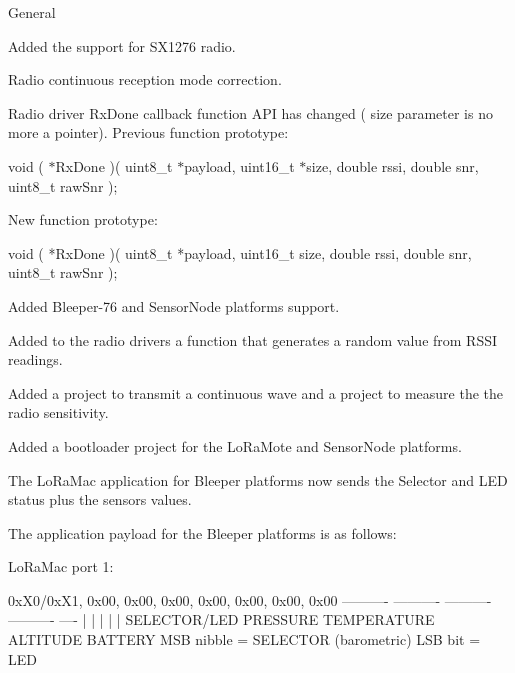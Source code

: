 \begin{DoxyItemize}
\item General
\begin{DoxyEnumerate}
\item Added the support for S\+X1276 radio.
\item Radio continuous reception mode correction.
\item Radio driver Rx\+Done callback function A\+PI has changed ( size parameter is no more a pointer). Previous function prototype\+:

void ( $\ast$\+Rx\+Done )( uint8\+\_\+t $\ast$payload, uint16\+\_\+t $\ast$size, double rssi, double snr, uint8\+\_\+t raw\+Snr );

New function prototype\+: \begin{DoxyVerb} void    ( *RxDone )( uint8_t *payload, uint16_t size, double rssi, double snr, uint8_t rawSnr );
\end{DoxyVerb}

\item Added Bleeper-\/76 and Sensor\+Node platforms support.
\item Added to the radio drivers a function that generates a random value from R\+S\+SI readings.
\item Added a project to transmit a continuous wave and a project to measure the the radio sensitivity.
\item Added a bootloader project for the Lo\+Ra\+Mote and Sensor\+Node platforms.
\item The Lo\+Ra\+Mac application for Bleeper platforms now sends the Selector and L\+ED status plus the sensors values.
\begin{DoxyItemize}
\item The application payload for the Bleeper platforms is as follows\+:

Lo\+Ra\+Mac port 1\+: \begin{DoxyVerb} { 0xX0/0xX1, 0x00, 0x00, 0x00, 0x00, 0x00, 0x00, 0x00 }
  ----------  ----------  ----------  ----------  ----
       |           |           |           |        |
 SELECTOR/LED  PRESSURE   TEMPERATURE  ALTITUDE  BATTERY
 MSB nibble = SELECTOR               (barometric)
 LSB bit    = LED
\end{DoxyVerb}


\end{DoxyItemize}
\end{DoxyEnumerate}
\end{DoxyItemize}
